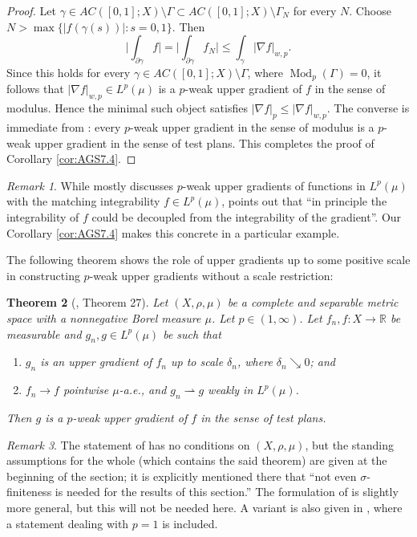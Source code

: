 \documentclass[11pt]{amsart}
\newtheorem{theorem}{Theorem}[section]
\theoremstyle{definition}
\theoremstyle{remark}
\newtheorem{remark}[theorem]{Remark}
\numberwithin{equation}{section}
\newcommand{\abs}[1]{|#1|}
\newcommand{\Babs}[1]{\Big|#1\Big|}
\begin{document}
\begin{proof}
Let $\gamma\in AC([0,1];X)\setminus\Gamma\subset AC([0,1];X)\setminus\Gamma_N$ for every
$N$. Choose $N>\max\{\abs{f(\gamma(s))}:s=0,1\}$. Then
\begin{equation*}
  \Babs{\int_{\partial\gamma}f}
  =\Babs{\int_{\partial\gamma}f_N}
  \leq\int_\gamma\abs{\nabla f}_{w,p}.
\end{equation*}
Since this holds for every $\gamma\in AC([0,1];X)\setminus\Gamma$,
where $\operatorname{Mod}_p(\Gamma)=0$, it follows that
$\abs{\nabla f}_{w,p}\in L^p(\mu)$ is a $p$-weak upper gradient of $f$ in the sense of
modulus.
Hence the minimal such object satisfies $\abs{\nabla f}_p\leq \abs{\nabla f}_{w,p}$. The
converse is immediate from \cite[Remark 4.12]{AGS:13}: every $p$-weak upper gradient in the
sense of modulus is a $p$-weak upper gradient in the sense of test plans.
This completes the proof of Corollary \ref{cor:AGS7.4}.
\end{proof}

\begin{remark}
While \cite{AGS:13} mostly discusses $p$-weak upper gradients of functions in $L^p(\mu)$
with the matching integrability $f\in L^p(\mu)$, \cite[Remark 4.4]{AGS:13} points out that
``in principle the integrability of $f$ could be decoupled from the integrability of the
gradient''. Our Corollary \ref{cor:AGS7.4} makes this concrete in a particular example.
\end{remark}

The following theorem shows the role of upper gradients up to some positive scale in
constructing $p$-weak upper gradients without a scale restriction:

\begin{theorem}[\cite{ACDM}, Theorem 27]\label{thm:ACDM27}
Let $(X,\rho,\mu)$ be a complete and separable metric space with a nonnegative Borel measure
$\mu$.
Let $p\in(1,\infty)$. Let $f_n,f:X\to\mathbb R$ be measurable and  $g_n,g\in L^p(\mu)$ be
such that
\begin{enumerate}[\rm(i)]
  \item $g_n$ is an upper gradient of $f_n$ up to scale $\delta_n$, where $\delta_n\searrow
  0$; and
  \item $f_n\to f$ pointwise $\mu$-a.e., and $g_n\rightharpoonup g$ weakly in $L^p(\mu)$.
\end{enumerate}
Then $g$ is a $p$-weak upper gradient of $f$ in the sense of test plans.
\end{theorem}

\begin{remark}
The statement of \cite[Theorem 27]{ACDM} has no conditions on $(X,\rho,\mu)$, but the
standing assumptions for the whole \cite[Section 4]{ACDM} (which contains the said theorem)
are given at the beginning of the section; it is explicitly mentioned there that ``not even
$\sigma$-finiteness is needed for the results of this section.'' The formulation of
\cite[Theorem 27]{ACDM} is slightly more general, but this will not be needed here. A
variant is also given in \cite[Lemma 2.6]{DMS}, where a statement dealing with $p=1$ is
included.
\end{remark}
\end{document}
